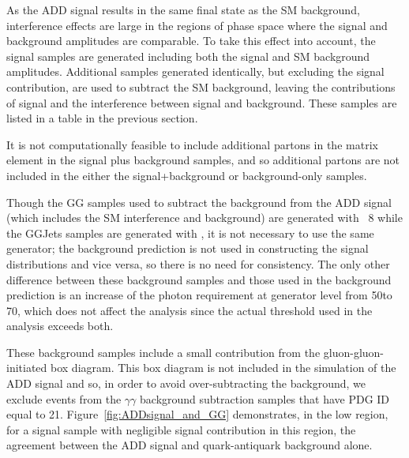 
As the ADD signal results in the same final state as the SM
background, interference effects are large in the regions of phase space where the signal and background amplitudes are comparable.
To take this effect into account, the signal samples are generated including both the signal and SM background amplitudes.
Additional samples generated identically, but excluding the signal contribution, are used to subtract the SM background, leaving the contributions of
signal and the interference between signal and background. These samples are listed in a table in the previous section.

It is not computationally feasible to include additional partons in
the matrix element in the signal plus background samples, and so
additional partons are not included in the either the 
signal+background or background-only samples.

Though the \textrm{GG} samples used to subtract the background from the ADD signal (which includes the SM interference and background) are generated with \PYTHIA~8 while the \textrm{GGJets}
samples are generated with \SHERPA, it is not necessary to use the same generator; the background prediction is not used in constructing the signal distributions and vice versa, so there is
no need for consistency. The only other difference between these background samples and those used in the background prediction is an increase of the photon \pt requirement at
generator level from 50\GeV to 70\GeV, which does not affect the
analysis since the actual \pt threshold used in the analysis exceeds both.

These background samples include a small contribution from the gluon-gluon-initiated box diagram.
This box diagram is not included in the simulation of the ADD signal and so, in order to avoid over-subtracting the background, we exclude events from the $\gamma\gamma$ background subtraction samples that have PDG ID equal to 21. Figure~\ref{fig:ADDsignal_and_GG} demonstrates, in the low \mgg region, for a signal sample with negligible signal contribution in this region, the agreement between the ADD signal and quark-antiquark background alone. 

